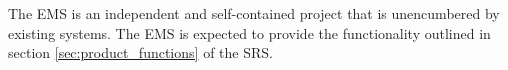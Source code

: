 The EMS is an independent and self-contained project that is unencumbered by existing systems. The EMS is expected to provide the functionality outlined in section \ref{sec:product_functions} of the SRS.
